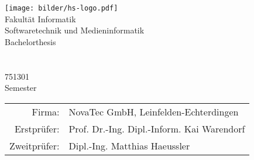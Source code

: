 \begin{titlepage}
	\begin{center}
		\texttt{[image: bilder/hs-logo.pdf]}\\
		\vspace{1cm} \Large Fakultät Informatik\\
		\vspace{0.5cm} \Large Softwaretechnik und Medieninformatik\\
		\vspace{1.25cm} \Large Bachelorthesis\\
		\vspace{0.5cm} \Huge \thetitle \\
		\vspace{1.5cm} \Large \theauthor \\
		\vspace{0.2cm} \small 751301\\
		\vspace{0.5cm} \normalsize Semester \the\year\\
		\vfill
		
		\begin{tabular}{rl}
			Firma: & NovaTec GmbH, Leinfelden-Echterdingen\\[0.3cm]
			Erstprüfer: & Prof. Dr.-Ing. Dipl.-Inform. Kai Warendorf\\ [0.1cm]
			Zweitprüfer: & Dipl.-Ing. Matthias Haeussler\\
		\end{tabular}
	\end{center}
\end{titlepage}